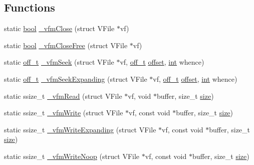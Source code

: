 \subsection*{Functions}
\begin{DoxyCompactItemize}
\item 
static \mbox{\hyperlink{libretro_8h_a4a26dcae73fb7e1528214a068aca317e}{bool}} \mbox{\hyperlink{vfs-mem_8c_ab569910e874a68f8a9a7c8440c5d0781}{\+\_\+vfm\+Close}} (struct V\+File $\ast$vf)
\item 
static \mbox{\hyperlink{libretro_8h_a4a26dcae73fb7e1528214a068aca317e}{bool}} \mbox{\hyperlink{vfs-mem_8c_a069232afe676b38b6fc35d195b890a78}{\+\_\+vfm\+Close\+Free}} (struct V\+File $\ast$vf)
\item 
static \mbox{\hyperlink{__builder_8h_a53066be3c3a28d8b8ccb3dc95c1e49b1}{off\+\_\+t}} \mbox{\hyperlink{vfs-mem_8c_ad6a2ccb75384ff6a3250c97887f3eab8}{\+\_\+vfm\+Seek}} (struct V\+File $\ast$vf, \mbox{\hyperlink{__builder_8h_a53066be3c3a28d8b8ccb3dc95c1e49b1}{off\+\_\+t}} \mbox{\hyperlink{ioapi_8h_a601c4660e8a1a14a1b87fe387e934d19}{offset}}, \mbox{\hyperlink{ioapi_8h_a787fa3cf048117ba7123753c1e74fcd6}{int}} whence)
\item 
static \mbox{\hyperlink{__builder_8h_a53066be3c3a28d8b8ccb3dc95c1e49b1}{off\+\_\+t}} \mbox{\hyperlink{vfs-mem_8c_a64c95798476ef7c379ec749c009d1de5}{\+\_\+vfm\+Seek\+Expanding}} (struct V\+File $\ast$vf, \mbox{\hyperlink{__builder_8h_a53066be3c3a28d8b8ccb3dc95c1e49b1}{off\+\_\+t}} \mbox{\hyperlink{ioapi_8h_a601c4660e8a1a14a1b87fe387e934d19}{offset}}, \mbox{\hyperlink{ioapi_8h_a787fa3cf048117ba7123753c1e74fcd6}{int}} whence)
\item 
static ssize\+\_\+t \mbox{\hyperlink{vfs-mem_8c_a2df17620d537539e814f3c9e83d13f2b}{\+\_\+vfm\+Read}} (struct V\+File $\ast$vf, void $\ast$buffer, size\+\_\+t \mbox{\hyperlink{ioapi_8h_a014d89bd76f74ef3a29c8f04b473eb76}{size}})
\item 
static ssize\+\_\+t \mbox{\hyperlink{vfs-mem_8c_a04e4a17947fad38e8dc65aa473246595}{\+\_\+vfm\+Write}} (struct V\+File $\ast$vf, const void $\ast$buffer, size\+\_\+t \mbox{\hyperlink{ioapi_8h_a014d89bd76f74ef3a29c8f04b473eb76}{size}})
\item 
static ssize\+\_\+t \mbox{\hyperlink{vfs-mem_8c_af41215a641c6a686b6d1e725a959b7c3}{\+\_\+vfm\+Write\+Expanding}} (struct V\+File $\ast$vf, const void $\ast$buffer, size\+\_\+t \mbox{\hyperlink{ioapi_8h_a014d89bd76f74ef3a29c8f04b473eb76}{size}})
\item 
static ssize\+\_\+t \mbox{\hyperlink{vfs-mem_8c_afac142894089fc65408a65e519c5bcb7}{\+\_\+vfm\+Write\+Noop}} (struct V\+File $\ast$vf, const void $\ast$buffer, size\+\_\+t \mbox{\hyperlink{ioapi_8h_a014d89bd76f74ef3a29c8f04b473eb76}{size}})

\end{DoxyCompactItemize}
